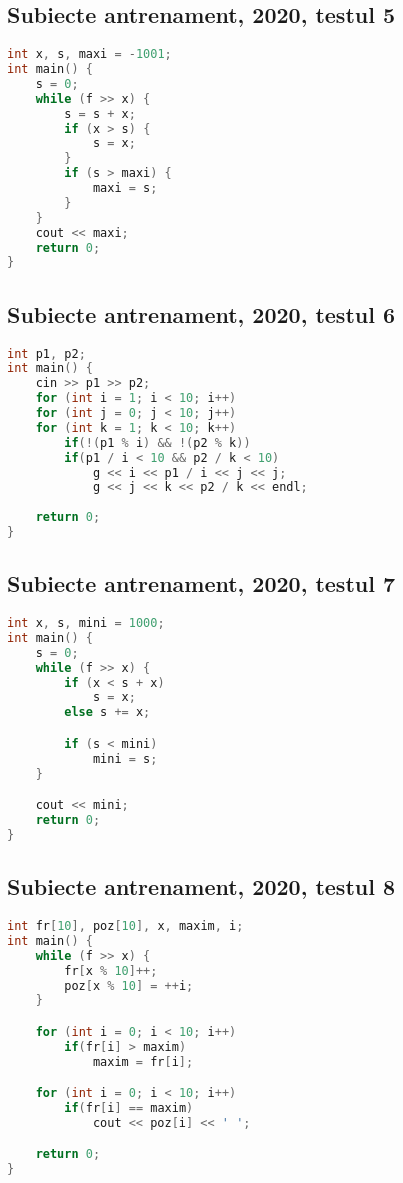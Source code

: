 \documentclass[10pt, a4paper, twocolumn]{article}
\begin{document}
\subsection*{Subiecte antrenament, 2020, testul 5}
\begin{lstlisting}[language=C++]
int x, s, maxi = -1001;
int main() {
    s = 0;
    while (f >> x) {
        s = s + x;
        if (x > s) {
            s = x;
        }
        if (s > maxi) {
            maxi = s;
        }
    }
    cout << maxi;
    return 0;
}
\end{lstlisting}

\subsection*{Subiecte antrenament, 2020, testul 6}
\begin{lstlisting}[language=C++]
int p1, p2;
int main() {
    cin >> p1 >> p2;
    for (int i = 1; i < 10; i++)
    for (int j = 0; j < 10; j++)
    for (int k = 1; k < 10; k++)
        if(!(p1 % i) && !(p2 % k))
        if(p1 / i < 10 && p2 / k < 10)
            g << i << p1 / i << j << j;
            g << j << k << p2 / k << endl;
    
    return 0;
}
\end{lstlisting}


\subsection*{Subiecte antrenament, 2020, testul 7}
\begin{lstlisting}[language=C++]
int x, s, mini = 1000;
int main() {
    s = 0;
    while (f >> x) {
        if (x < s + x)
            s = x;
        else s += x;

        if (s < mini)
            mini = s;
    }

    cout << mini;
    return 0;
}
\end{lstlisting}


\subsection*{Subiecte antrenament, 2020, testul 8}
\begin{lstlisting}[language=C++]
int fr[10], poz[10], x, maxim, i;
int main() {
    while (f >> x) {
        fr[x % 10]++;
        poz[x % 10] = ++i;
    }

    for (int i = 0; i < 10; i++)
        if(fr[i] > maxim)
            maxim = fr[i];    

    for (int i = 0; i < 10; i++)
        if(fr[i] == maxim)
            cout << poz[i] << ' ';

    return 0;
}
\end{lstlisting}
\end{document}
